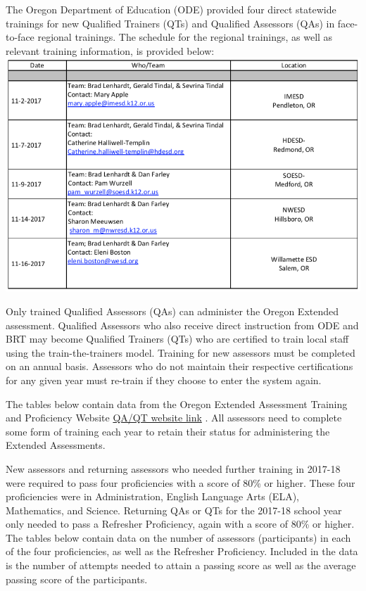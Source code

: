 \documentclass[]{article}
\begin{document}
The Oregon Department of Education (ODE) provided four direct statewide
trainings for new Qualified Trainers (QTs) and Qualified Assessors (QAs)
in face-to-face regional trainings. The schedule for the regional
trainings, as well as relevant training information, is provided below:
\FloatBarrier
\includegraphics{Figures/TrainingSched/TraingSched.png}

Only trained Qualified Assessors (QAs) can administer the Oregon
Extended assessment. Qualified Assessors who also receive direct
instruction from ODE and BRT may become Qualified Trainers (QTs) who are
certified to train local staff using the train-the-trainers model.
Training for new assessors must be completed on an annual basis.
Assessors who do not maintain their respective certifications for any
given year must re-train if they choose to enter the system again.

The tables below contain data from the Oregon Extended Assessment
Training and Proficiency Website \color{link}
\href{http://or.k12test.com/}{QA/QT website link} \color{black}. All
assessors need to complete some form of training each year to retain
their status for administering the Extended Assessments.

New assessors and returning assessors who needed further training in
2017-18 were required to pass four proficiencies with a score of 80\% or
higher. These four proficiencies were in Administration, English
Language Arts (ELA), Mathematics, and Science. Returning QAs or QTs for
the 2017-18 school year only needed to pass a Refresher Proficiency,
again with a score of 80\% or higher. The tables below contain data on
the number of assessors (participants) in each of the four
proficiencies, as well as the Refresher Proficiency. Included in the
data is the number of attempts needed to attain a passing score as well
as the average passing score of the participants.
\end{document}
